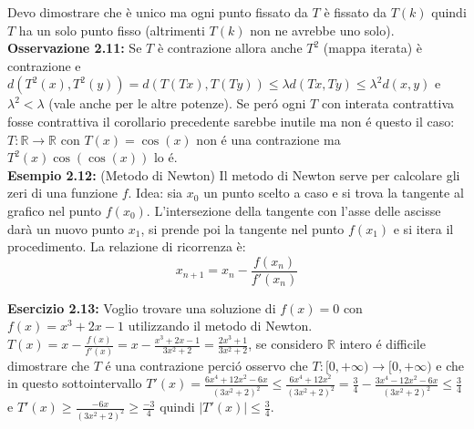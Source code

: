 \documentclass[a4paper,11pt,titlepage]{book}
\begin{document}
Devo dimostrare che è unico ma ogni punto fissato da $T$ è fissato da $T{(k)}$ quindi $T$ ha un solo punto fisso (altrimenti $T{(k)}$ non ne avrebbe uno solo).\\

\textbf{Osservazione 2.11:} Se $T$ è contrazione allora anche $T^{2}$ (mappa iterata) è contrazione e $d(T^2(x),T^2(y))=d(T(Tx),T(Ty))\leq\lambda d(Tx,Ty)\leq \lambda^2 d(x,y)$ e $\lambda^2<\lambda$ (vale anche per le altre potenze). Se peró ogni $T$ con interata contrattiva fosse contrattiva il corollario precedente sarebbe inutile ma non é questo il caso: \\

$T:\mathbb{R}\to\mathbb{R}$ con $T(x)=\cos (x)$ non é una contrazione ma $T^2(x)\cos(\cos(x))$ lo é. \\

\textbf{Esempio 2.12:} (Metodo di Newton) Il metodo di Newton serve per calcolare gli zeri di una funzione $f$. Idea: sia $x_0$ un punto scelto a caso e si trova la tangente al grafico nel punto $f(x_0)$. L'intersezione della tangente con l'asse delle ascisse darà un nuovo punto $x_1$, si prende poi la tangente nel punto $f(x_1)$ e si itera il procedimento. La relazione di ricorrenza è: $$x_{n+1}=x_n-\frac{f(x_n)}{f'(x_n)}$$ 

\begin{center}
\end{center}

\textbf{Esercizio 2.13:} Voglio trovare una soluzione di $f(x)=0$ con $f(x)=x^3+2x-1$ utilizzando il metodo di Newton. $T(x)=x-\frac{f(x)}{f'(x)}=x-\frac{x^3+2x-1}{3x^2+2}=\frac{2x^3+1}{3x^2+2}$, se considero $\mathbb{R}$ intero é difficile dimostrare che $T$ é una contrazione perció osservo che $T:[0,+\infty)\to[0,+\infty)$ e che in questo sottointervallo $T'(x)=\frac{6x^4+12x^2-6x}{(3x^2+2)^2}\leq\frac{6x^4+12x^2}{(3x^2+2)^2}=\frac{3}{4}-\frac{3x^4-12x^2-6x}{(3x^2+2)^2}\leq\frac{3}{4}$ e $T'(x)\geq\frac{-6x}{(3x^2+2)^2}\geq\frac{-3}{4}$ quindi $|T'(x)|\leq\frac{3}{4}$. \\
\end{document}
